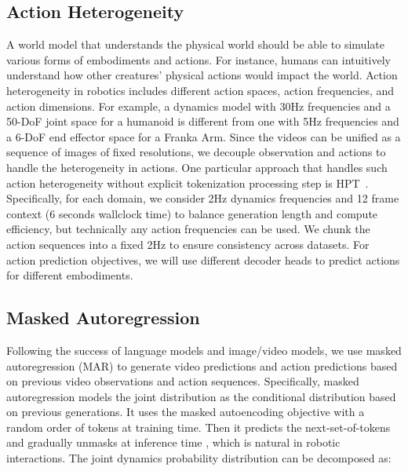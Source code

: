 \subsection{Action Heterogeneity}
A world model that understands the physical world should be able to simulate various forms of embodiments and actions. For instance, humans can intuitively understand how other creatures' physical actions would impact the world. Action heterogeneity in robotics includes different action spaces, action frequencies, and action dimensions. For example, a dynamics model with 30Hz frequencies and a 50-DoF joint space for a humanoid is different from one with 5Hz frequencies and a 6-DoF end effector space for a Franka Arm. Since the videos can be unified as a sequence of images of fixed resolutions, we decouple observation and actions to handle the heterogeneity in actions. One particular approach that handles such action heterogeneity without explicit tokenization processing step is HPT~\cite{wang2024scaling}. Specifically, for each domain, we consider 2Hz dynamics frequencies and 12 frame context (6 seconds wallclock time) to balance generation length and compute efficiency, but technically any action frequencies can be used. We chunk the action sequences into a fixed 2Hz to ensure consistency across datasets. For action prediction objectives, we will use different decoder heads to predict actions for different embodiments.


\subsection{Masked Autoregression}
Following the success of language models and image/video models, we use masked autoregression (MAR) \cite{1X_Technologies_1X_World_Model_2024,chang2022maskgit} to generate video predictions and action predictions based on previous video observations and action sequences. Specifically, masked autoregression models the joint distribution as the conditional distribution based on previous generations. It uses the masked autoencoding objective with a random order of tokens at training time. Then it predicts the next-set-of-tokens and
gradually unmasks at inference time \cite{li2024autoregressive}, which is natural in robotic interactions. The joint dynamics probability distribution can be decomposed as:

